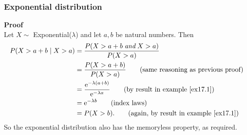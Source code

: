 \subsubsection{Exponential distribution}
\textbf{Proof} \\
Let $X \sim$ Exponential($\lambda$) and let $a,b$ be natural numbers. Then
\begin{align*}
P(X > a + b \mid X > a) & = \frac{P(X > a + b \; \textit{and} \; X > a)}{P(X > a)} \\
		& = \frac{P(X > a + b)}{P(X > a)} \tag{same reasoning as previous proof} \\
		& = \frac{\e^{-\lambda (a+b)}}{\e^{-\lambda a}} \tag{by result in example \ref{ex17.1}} \\
		& = \e^{-\lambda b} \tag{index laws} \\
		& = P(X > b). \tag{again, by result in example \ref{ex17.1}}
\end{align*}
So the exponential distribution also has the memoryless property, as required.

